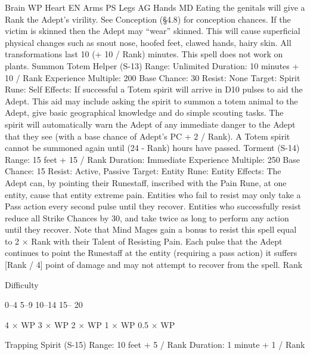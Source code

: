\documentclass[a4paper]{article}
\begin{document}
\begin{multicols}{3}
Brain
WP
Heart
EN
Arms
PS
Legs
AG
Hands
MD
Eating the genitals will give a Rank%
the Adept’s virility. See Conception (§4.8) for
conception chances.
If the victim is skinned then the Adept may “wear”
skinned. This will cause superficial physical
changes such as snout nose, hoofed feet, clawed
hands, hairy skin.
All transformations last 10 (+ 10 / Rank) minutes.
This spell does not work on plants.
Summon Totem Helper (S-13)
Range: Unlimited
Duration: 10 minutes + 10 / Rank
Experience Multiple: 200
Base Chance: 30%
Resist: None
Target: Spirit
Rune: Self
Effects: If successful a Totem spirit will arrive in
D10 pulses to aid the Adept. This aid may include
asking the spirit to summon a totem animal to the
Adept, give basic geographical knowledge and do
simple scouting tasks. The spirit will automatically
warn the Adept of any immediate danger to the
Adept that they see (with a base chance of Adept’s
PC + 2 / Rank). A Totem spirit cannot be summoned again until (24 - Rank) hours have passed.
Torment (S-14)
Range: 15 feet + 15 / Rank
Duration: Immediate
Experience Multiple: 250
Base Chance: 15%
Resist: Active, Passive
Target: Entity
Rune: Entity
Effects: The Adept can, by pointing their
Runestaff, inscribed with the Pain Rune, at one
entity, cause that entity extreme pain. Entities who
fail to resist may only take a Pass action every
second pulse until they recover. Entities who successfully resist reduce all Strike Chances by 30,
and take twice as long to perform any action until
they recover. Note that Mind Mages gain a bonus
to resist this spell equal to 2 × Rank with their
Talent of Resisting Pain.
Each pulse that the Adept continues to point the
Runestaff at the entity (requiring a pass action) it
suffers [Rank / 4] point of damage and may not
attempt to recover from the spell.
Rank

Difficulty

0–4
5–9
10–14
15–
20

4 × WP
3 × WP
2 × WP
1 × WP
0.5 × WP

Trapping Spirit (S-15)
Range: 10 feet + 5 / Rank
Duration: 1 minute + 1 / Rank


\end{multicols}
\end{document}
